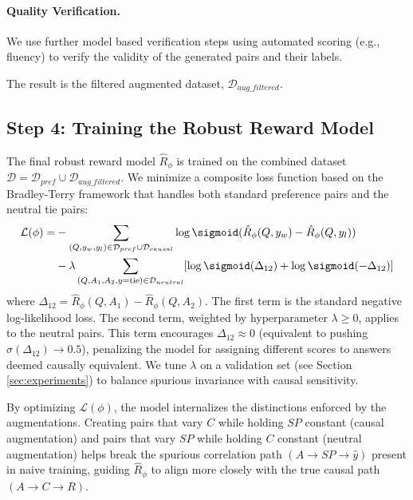 \paragraph{Quality Verification.} We use further model based verification steps using automated scoring (e.g., fluency) to verify the validity of the generated pairs and their labels.

The result is the filtered augmented dataset, $\mathcal{D}_{aug\_filtered}$.

\subsection{Step 4: Training the Robust Reward Model}
\label{subsec:training_revised}

The final robust reward model $\hat{R}_\phi$ is trained on the combined dataset $\mathcal{D} = \mathcal{D}_{pref} \cup \mathcal{D}_{aug\_filtered}$. We minimize a composite loss function based on the Bradley-Terry framework that handles both standard preference pairs and the neutral tie pairs:
\begin{align}
\mathcal{L}(\phi) = &- \sum_{(Q, y_w, y_l) \in \mathcal{D}_{pref} \cup \mathcal{D}_{causal}} \log \sigmoid(\hat{R}_\phi(Q, y_w) - \hat{R}_\phi(Q, y_l)) \nonumber \\
&- \lambda \sum_{(Q, A_1, A_2, y=\text{tie})\in \mathcal{D}_{neutral}} [ \log \sigmoid(\Delta_{12}) + \log \sigmoid(-\Delta_{12}) ]
\label{eq:combined_loss_methodology_final_revised}
\end{align}
where $\Delta_{12} = \hat{R}_\phi(Q, A_1) - \hat{R}_\phi(Q, A_2)$. The first term is the standard negative log-likelihood loss. The second term, weighted by hyperparameter $\lambda \ge 0$, applies to the neutral pairs. This term encourages $\Delta_{12} \approx 0$ (equivalent to pushing $\sigma(\Delta_{12}) \to 0.5$), penalizing the model for assigning different scores to answers deemed causally equivalent. We tune $\lambda$ on a validation set (see Section \ref{sec:experiments}) to balance spurious invariance with causal sensitivity.

By optimizing $\mathcal{L}(\phi)$, the model internalizes the distinctions enforced by the augmentations. Creating pairs that vary $C$ while holding $SP$ constant (causal augmentation) and pairs that vary $SP$ while holding $C$ constant (neutral augmentation) helps break the spurious correlation path $(A \to SP \to \hat{y})$ present in naive training, guiding $\hat{R}_\phi$ to align more closely with the true causal path $(A \to C \to R)$.

